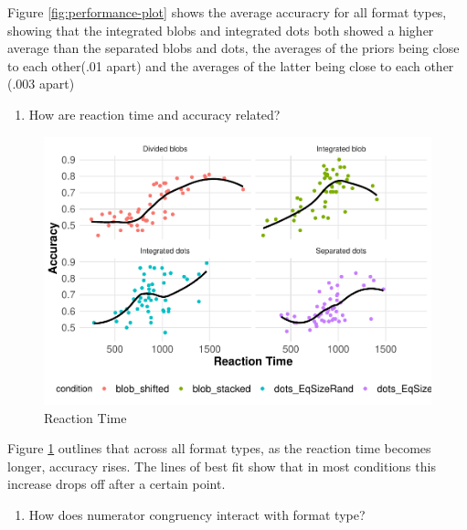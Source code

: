 \documentclass[
  man,floatsintext]{apa6}
\providecommand{\tightlist}{%
  \setlength{\itemsep}{0pt}\setlength{\parskip}{0pt}}
\begin{document}
Figure \ref{fig:performance-plot} shows the average accuracry for all format types, showing that the integrated blobs and integrated dots both showed a higher average than the separated blobs and dots, the averages of the priors being close to each other(.01 apart) and the averages of the latter being close to each other (.003 apart)

\begin{enumerate}
\def\labelenumi{\arabic{enumi}.}
\setcounter{enumi}{1}
\tightlist
\item
  How are reaction time and accuracy related?
  \newpage
\end{enumerate}

\begin{figure}
\centering
\includegraphics{Choudhary_WA11_files/figure-latex/rt-1.pdf}
\caption{\label{fig:rt}Reaction Time}
\end{figure}

Figure \ref{fig:rt} outlines that across all format types, as the reaction time becomes longer, accuracy rises. The lines of best fit show that in most conditions this increase drops off after a certain point.

\newpage

\begin{enumerate}
\def\labelenumi{\arabic{enumi}.}
\setcounter{enumi}{2}
\tightlist
\item
  How does numerator congruency interact with format type?
\end{enumerate}
\end{document}
